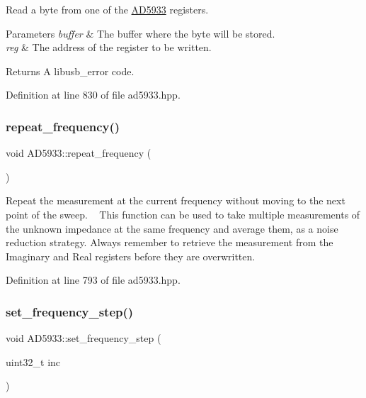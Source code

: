 Read a byte from one of the \mbox{\hyperlink{struct_a_d5933}{A\+D5933}} registers. 


\begin{DoxyParams}{Parameters}
{\em buffer} & The buffer where the byte will be stored. \\
\hline
{\em reg} & The address of the register to be written. \\
\hline
\end{DoxyParams}
\begin{DoxyReturn}{Returns}
A libusb\+\_\+error code. 
\end{DoxyReturn}


Definition at line 830 of file ad5933.\+hpp.

\mbox{\label{struct_a_d5933_ae45640525e7312ee70e98bb6f1a0c3ae}} 
\subsubsection{\texorpdfstring{repeat\+\_\+frequency()}{repeat\_frequency()}}
{\footnotesize\ttfamily void A\+D5933\+::repeat\+\_\+frequency (\begin{DoxyParamCaption}{ }\end{DoxyParamCaption})}

Repeat the measurement at the current frequency without moving to the next point of the sweep. ~\newline
 This function can be used to take multiple measurements of the unknown impedance at the same frequency and average them, as a noise reduction strategy. Always remember to retrieve the measurement from the Imaginary and Real registers before they are overwritten. 

Definition at line 793 of file ad5933.\+hpp.

\mbox{\label{struct_a_d5933_ab55703415fd754ccef3f3ff188903a9e}} 
\subsubsection{\texorpdfstring{set\+\_\+frequency\+\_\+step()}{set\_frequency\_step()}}
{\footnotesize\ttfamily void A\+D5933\+::set\+\_\+frequency\+\_\+step (\begin{DoxyParamCaption}\item[{uint32\+\_\+t}]{inc }\end{DoxyParamCaption})}



